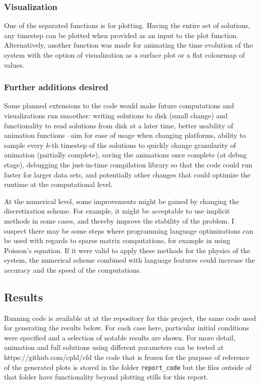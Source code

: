 \documentclass[11pt]{article}
\begin{document}
{\subsubsection{Visualization}
One of the separated functions is for plotting. Having the entire set of solutions, any
timestep can be plotted when provided as an input to the plot function. Alternatively,
another function was made for animating the time evolution of the system with the option
of visualization as a surface plot or a flat colourmap of values.

\subsubsection{Further additions desired}
Some planned extensions to the code would make future computations and visualizations
run smoother: writing solutions to disk (small change) and functionality to read solutions
from disk at a later time, better usability of animation functions --aim for ease of usage
when changing platforms, ability to sample every $k$-th timestep of the solutions to
quickly change granularity of animation (partially complete), saving the animations once
complete (at debug stage), debugging the just-in-time compilation library so that the code
could run faster for larger data sets, and potentially other changes that could optimize the
runtime at the computational level.

At the numerical level, some improvements might be gained by changing the discretization
scheme. For example, it might be acceptable to use implicit methods in some cases, and thereby
improve the stability of the problem. I suspect there may be some steps where programming
language optimizations can be used with regards to sparse matrix computations, for example
in using Poisson's equation. If it were valid to apply these methods for the physics of the
system, the numerical scheme combined with language features could increase the accuracy and
the speed of the computations.

\subsection{Results}

Running code is available at at the repository for this project, the same code used for
generating the results below. For each case here, particular initial conditions were specified
and a selection of notable results are shown. For more detail, animation and full solutions
using different parameters can be tested at https://github.com/cphl/cfd the code that is
frozen for the purpose of reference of the generated plots is stored in the folder 
\texttt{report\_code} but the files outside of that folder have functionality beyond
plotting stills for this report.


}
\end{document}

